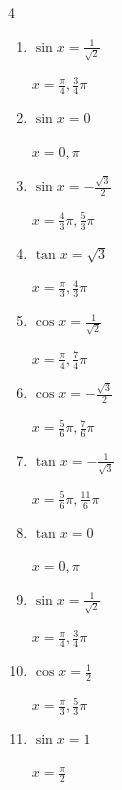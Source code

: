 \begin{multicols}{4}
\begin{enumerate}
        $\displaystyle x = \frac{7}{6}\pi , \frac{11}{6}\pi$

  \item $\displaystyle \sin{x}  = \frac{1}{\sqrt{2}}$

        $\displaystyle x = \frac{\pi}{4} , \frac{3}{4}\pi$

\columnbreak %

  \item $\displaystyle \sin{x}  = 0$

        $\displaystyle x = 0 , \pi$

  \item $\displaystyle \sin{x}  = -\frac{\sqrt{3}}{2}$

        $\displaystyle x = \frac{4}{3}\pi , \frac{5}{3}\pi$

  \item $\displaystyle \tan{x}  = \sqrt{3}$

        $\displaystyle x = \frac{\pi}{3} , \frac{4}{3}\pi$

  \item $\displaystyle \cos{x}  = \frac{1}{\sqrt{2}}$

        $\displaystyle x = \frac{\pi}{4} , \frac{7}{4}\pi$

  \item $\displaystyle \cos{x}  = -\frac{\sqrt{3}}{2}$

        $\displaystyle x = \frac{5}{6}\pi , \frac{7}{6}\pi$

  \item $\displaystyle \tan{x}  = -\frac{1}{\sqrt{3}}$

        $\displaystyle x = \frac{5}{6}\pi , \frac{11}{6}\pi$

  \item $\displaystyle \tan{x}  = 0$

        $\displaystyle x = 0 , \pi$

  \item $\displaystyle \sin{x}  = \frac{1}{\sqrt{2}}$

        $\displaystyle x = \frac{\pi}{4} , \frac{3}{4}\pi$

  \item $\displaystyle \cos{x}  = \frac{1}{2}$

        $\displaystyle x = \frac{\pi}{3} , \frac{5}{3}\pi$

  \item $\displaystyle \sin{x}  = 1$

        $\displaystyle x = \frac{\pi}{2}$


\end{enumerate}
\end{multicols}
